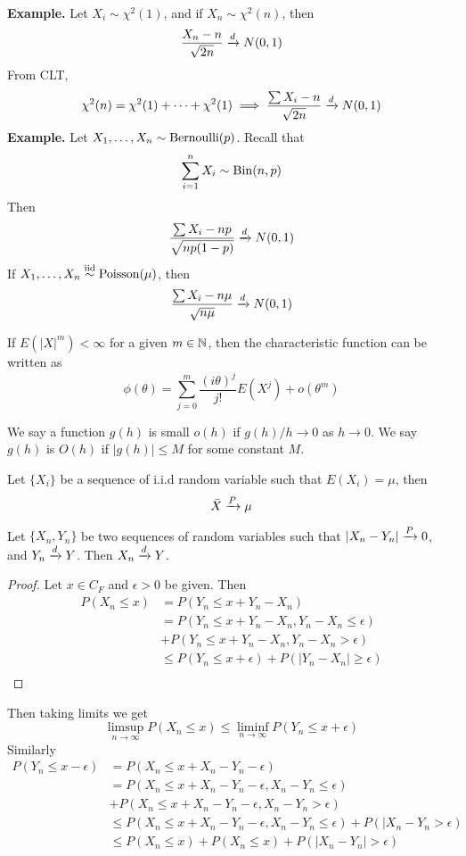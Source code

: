 \documentclass[openany]{report}
\begin{document}
\textbf{Example.} Let $X_i \sim \chi^2(1)$, and if $X_n \sim \chi^2(n)$, then 
\[\frac{X_n - n}{\sqrt{2n}} \xrightarrow{d} N(0,1)\]
From CLT, 
\[\chi^2(n) = \chi^2(1) + \cdots + \chi^2(1) \implies \frac{\sum X_i - n}{\sqrt{2n}} \xrightarrow{d} N(0,1)\]
\textbf{Example.} Let $X_1, \ldots, X_n \sim \operatorname{Bernoulli}(p)$. Recall that 
\[\sum_{i=1}^n X_i \sim \operatorname{Bin}(n,p)\]
Then 
\[\frac{\sum X_i - np }{\sqrt{np(1-p)}} \xrightarrow{d} N(0,1)\]
If $X_1, \ldots, X_n \overset{\mathrm{iid}}{\sim} \operatorname{Poisson}(\mu)$, then 
\[\frac{\sum X_i - n\mu}{\sqrt{n\mu}} \xrightarrow{d} N(0,1)\]
\begin{theorem}
    If $E(|X|^m) < \infty$ for a given $m \in \mathbb{N}$, then the characteristic function can be written as
    \[\phi(\theta) = \sum_{j=0}^m \frac{(i\theta)^j}{j!} E(X^j) + o(\theta^m)\] 
\end{theorem}
We say a function $g(h)$ is small $o(h)$ if $g(h)/h \rightarrow 0$ as $h\rightarrow 0$. We say $g(h)$ is $O(h)$ if $|g(h)| \leq M$ for some constant $M$. 
\begin{theorem}
    Let $\{X_i\}$ be a sequence of i.i.d random variable such that $E(X_i) = \mu$, then 
    \[\bar{X} \xrightarrow{P} \mu\]
\end{theorem}
\begin{theorem}
    Let $\{X_n, Y_n\}$ be two sequences of random variables such that $|X_n - Y_n| \xrightarrow{P} 0$, and $Y_n \xrightarrow{d} Y$. Then $X_n \xrightarrow{d} Y$.
\end{theorem}
\begin{proof}
    Let $x \in C_F$ and $\epsilon > 0$ be given. Then 
    \begin{align*}
        P(X_n \leq x) &= P(Y_n \leq x + Y_n - X_n)\\
        &= P(Y_n \leq x + Y_n - X_n, Y_n - X_n \leq \epsilon)\\
        &+ P(Y_n \leq x + Y_n - X_n, Y_n - X_n > \epsilon)\\
        &\leq P(Y_n \leq x + \epsilon) + P(|Y_n - X_n| \geq \epsilon)\\
    \end{align*}
\end{proof}
Then taking limits we get 
\[\limsup_{n\rightarrow\infty} P(X_n \leq x) \leq \liminf_{n\rightarrow\infty}P(Y_n \leq x + \epsilon)\]
Similarly 
\begin{align*}
    P(Y_n \leq x- \epsilon) &= P(X_n \leq x + X_n - Y_n - \epsilon)\\
    &= P(X_n \leq x + X_n - Y_n - \epsilon, X_n - Y_n \leq \epsilon)\\
    &+ P(X_n \leq x + X_n - Y_n - \epsilon, X_n - Y_n > \epsilon)\\
    &\leq P(X_n \leq x + X_n - Y_n - \epsilon, X_n - Y_n \leq \epsilon) + P(|X_n - Y_n > \epsilon)\\
    &\leq P(X_n\leq x) + P(X_n \leq x) + P(|X_n - Y_n| > \epsilon)
\end{align*}
\end{document}
